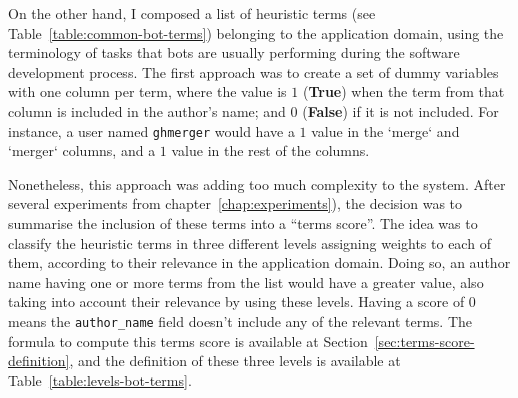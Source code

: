 \documentclass[a4paper, 12pt]{book}
\begin{document}
On the other hand, I composed a list of heuristic terms (see Table~\ref{table:common-bot-terms}) belonging to the application domain, using the terminology of tasks that bots are usually performing during the software development process.  The first approach was to create a set of dummy variables with one column per term, where the value is $1$ (\textbf{True}) when the term from that column is included in the author's name; and $0$ (\textbf{False}) if it is not included. For instance, a user named \texttt{ghmerger} would have a $1$ value in the `merge` and `merger` columns, and a $1$ value in the rest of the columns. 

Nonetheless, this approach was adding too much complexity to the system. After several experiments from chapter~\ref{chap:experiments}), the decision was to summarise the inclusion of these terms into a ``terms score''. The idea was to classify the heuristic terms in three different levels assigning weights to each of them, according to their relevance in the application domain. Doing so, an author name having one or more terms from the list would have a greater value, also taking into account their relevance by using these levels. Having a score of $0$ means the \texttt{author\_name} field doesn't include any of the relevant terms. The formula to compute this terms score is available at Section~\ref{sec:terms-score-definition}, and the definition of these three levels is available at Table~\ref{table:levels-bot-terms}. 
\end{document}
